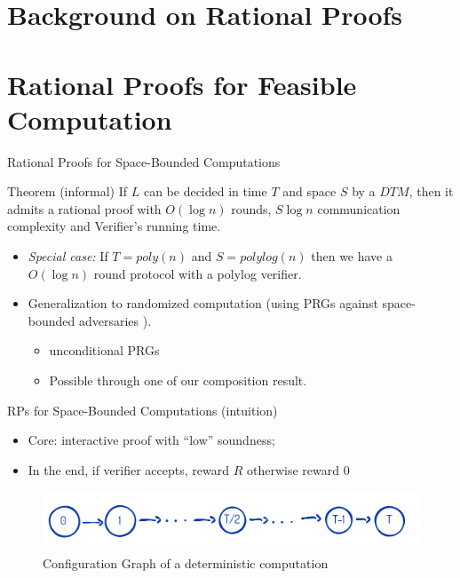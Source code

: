 \section{Background on Rational Proofs}


\section{Rational Proofs for Feasible Computation}

\begin{frame}{Rational Proofs for Space-Bounded Computations}
\begin{block}{Theorem (informal)}
	If $L$ can be decided in time $T$ and space $S$ by a $DTM$, then it admits a rational proof with $O(\log n)$ rounds, $S \log n$ communication complexity and Verifier's running time.
\end{block}
\pause
\begin{itemize}[<+->]
	\item \textit{Special case:} If $T=poly(n)$ and $S=polylog(n)$ then we have a $O(\log n)$ round protocol with a polylog verifier.
	\item Generalization to randomized computation (using PRGs against space-bounded adversaries \cite{nisan1992pseudorandom}).
	\begin{itemize}
		\item unconditional PRGs
		\item Possible through one of our composition result.
	\end{itemize}
\end{itemize}
\end{frame}

\begin{frame}{RPs for Space-Bounded Computations (intuition)}
\begin{itemize}
	\item Core: interactive proof with ``low'' soundness;\pause
	\item In the end, if verifier accepts, reward $R$ otherwise reward $0$
\end{itemize}
\medskip
\begin{figure}
	\pause
	\includegraphics[scale=0.3]{pics/space-protocol.png}
	\caption{Configuration Graph of a deterministic computation}
\end{figure}
\end{frame}

